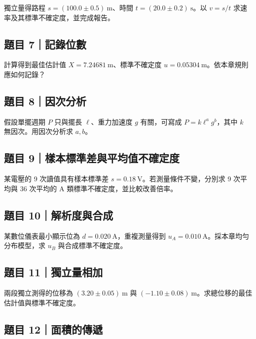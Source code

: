 \documentclass[11pt,a4paper]{article}
\begin{document}
獨立量得路程 \(s=(100.0\pm0.5)\ \mathrm{m}\)、時間 \(t=(20.0\pm0.2)\ \mathrm{s}\)。以 \(v=s/t\) 求速率及其標準不確定度，並完成報告。

\subsection{題目 7｜記錄位數}\label{ux984cux76ee-7ux8a18ux9304ux4f4dux6578}

計算得到最佳估計值 \(X=7.24681\ \mathrm{m}\)、標準不確定度 \(u=0.05304\ \mathrm{m}\)。依本章規則應如何記錄？

\subsection{題目 8｜因次分析}\label{ux984cux76ee-8ux56e0ux6b21ux5206ux6790}

假設單擺週期 \(P\) 只與擺長 \(\ell\)、重力加速度 \(g\) 有關，可寫成 \(P=k\ell^a g^b\)，其中 \(k\) 無因次。用因次分析求 \(a,b\)。

\subsection{題目 9｜樣本標準差與平均值不確定度}\label{ux984cux76ee-9ux6a23ux672cux6a19ux6e96ux5deeux8207ux5e73ux5747ux503cux4e0dux78baux5b9aux5ea6}

某電壓的 9 次讀值具有樣本標準差 \(s=0.18\ \mathrm{V}\)。若測量條件不變，分別求 9 次平均與 36 次平均的 A 類標準不確定度，並比較改善倍率。

\subsection{題目 10｜解析度與合成}\label{ux984cux76ee-10ux89e3ux6790ux5ea6ux8207ux5408ux6210}

某數位儀表最小顯示位為 \(d=0.020\ \mathrm{A}\)，重複測量得到 \(u_A=0.010\ \mathrm{A}\)。採本章均勻分布模型，求 \(u_B\) 與合成標準不確定度。

\subsection{題目 11｜獨立量相加}\label{ux984cux76ee-11ux7368ux7acbux91cfux76f8ux52a0}

兩段獨立測得的位移為 \((3.20\pm0.05)\ \mathrm{m}\) 與 \((-1.10\pm0.08)\ \mathrm{m}\)。求總位移的最佳估計值與標準不確定度。

\subsection{題目 12｜面積的傳遞}\label{ux984cux76ee-12ux9762ux7a4dux7684ux50b3ux905e}
\end{document}
